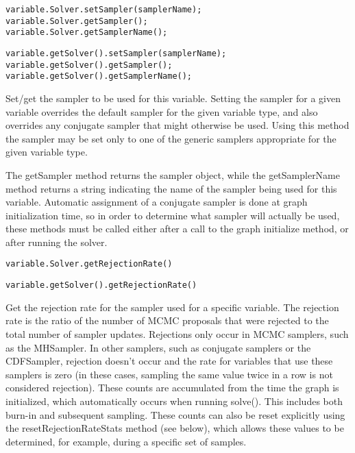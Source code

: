 \ifmatlab
\begin{lstlisting}
variable.Solver.setSampler(samplerName);
variable.Solver.getSampler();
variable.Solver.getSamplerName();
\end{lstlisting}
\fi

\ifjava
\begin{lstlisting}
variable.getSolver().setSampler(samplerName);
variable.getSolver().getSampler();
variable.getSolver().getSamplerName();
\end{lstlisting}
\fi

Set/get the sampler to be used for this variable.  Setting the sampler for a given variable overrides the default sampler for the given variable type, and also overrides any conjugate sampler that might otherwise be used.  Using this method the sampler may be set only to one of the generic samplers appropriate for the given variable type.

The getSampler method returns the sampler object, while the getSamplerName method returns a string indicating the name of the sampler being used for this variable.  Automatic assignment of a conjugate sampler is done at graph initialization time, so in order to determine what sampler will actually be used, these methods must be called either after a call to the graph initialize method, or after running the solver.

\ifmatlab
\begin{lstlisting}
variable.Solver.getRejectionRate()
\end{lstlisting}
\fi

\ifjava
\begin{lstlisting}
variable.getSolver().getRejectionRate()
\end{lstlisting}
\fi

Get the rejection rate for the sampler used for a specific variable.  The rejection rate is the ratio of the number of MCMC proposals that were rejected to the total number of sampler updates.  Rejections only occur in MCMC samplers, such as the MHSampler.  In other samplers, such as conjugate samplers or the CDFSampler, rejection doesn't occur and the rate for variables that use these samplers is zero (in these cases, sampling the same value twice in a row is not considered rejection).  These counts are accumulated from the time the graph is initialized, which automatically occurs when running solve().  This includes both burn-in and subsequent sampling.  These counts can also be reset explicitly using the resetRejectionRateStats method (see below), which allows these values to be determined, for example, during a specific set of samples.


